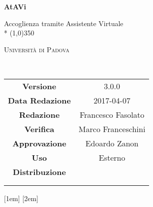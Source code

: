 \documentclass[a4paper,12pt]{article}
\date{\today}
\begin{document}
	\begin{titlepage}
		\centering
		{\huge\bfseries AtAVi\par}
		Accoglienza tramite Assistente Virtuale \\*
		\line(1,0){350} \\
		{\scshape\LARGE Università di Padova \par}
		\vspace{1cm}
		{\scshape\Large \glossarioRQ\ \par}
		\logo
		\newpage
		\begin{tabular}{c|c}
			{\hfill\textbf{Versione}} 				& 3.0.0			\\ 
			{\hfill\textbf{Data Redazione}} 	& 2017-04-07 		\\ 
			{\hfill\textbf{Redazione}} 			&  Francesco Fasolato \\ 
			{\hfill\textbf{Verifica}} 				& Marco Franceschini  \\ 
			{\hfill\textbf{Approvazione}} 		& Edoardo Zanon				\\
			{\hfill\textbf{Uso}} 						& Esterno 			\\
			{\hfill\textbf{Distribuzione}} 		& \vardanega \\ & \cardin \\ & \prop \\
		\end{tabular}
	\end{titlepage}
	
	\pagestyle{myfront}
	\newpage
		

	\newpage		
		{\vskip 0.7cm}
		{\scshape\bfseries\fontsize{2em}{2em}\selectfont}
		{\itshape}
		{}
		{}
		{}
		{}
		{\titlerule\contentspage}

	\newpage
		\tableofcontents
	
		\label{LastFrontPage}
		\newpage
			\pagestyle{mymain}

			\titleformat{\section}[block]{\bfseries\filcenter\fontsize{23pt}{20pt}\selectfont}{}{1em}{}

			\printglossary[style=myaltlistgroup, title=, toctitle=Glossario dei termini]
			\glsaddall

		\label{LastPage}
\end{document}

